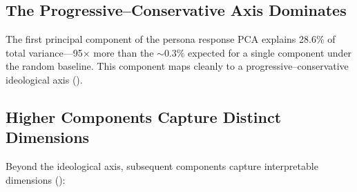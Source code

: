 \subsection{The Progressive--Conservative Axis Dominates}

The first principal component of the persona response PCA explains 28.6\% of total variance---95$\times$ more than the $\sim$0.3\% expected for a single component under the random baseline. This component maps cleanly to a progressive--conservative ideological axis ().

\begin{table}[t]
\centering
\caption{Top beliefs loading on PC1 of the persona response PCA (28.6\% of variance). Positive loadings correspond to progressive/liberal positions; negative loadings correspond to conservative/traditional positions.}
\label{tab:pc1}
\vspace{4pt}
\end{table}

\subsection{Higher Components Capture Distinct Dimensions}

Beyond the ideological axis, subsequent components capture interpretable dimensions ():

